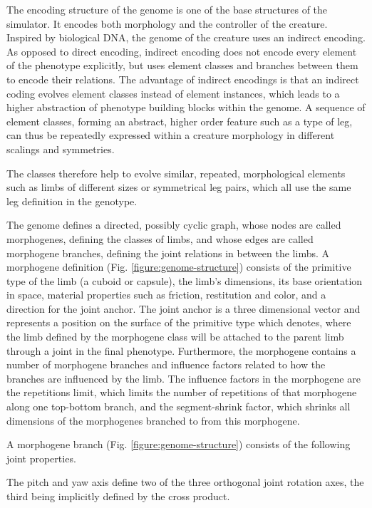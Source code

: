 \documentclass[main]{subfiles}
\begin{document}
The encoding structure of the genome is one of the base structures of the simulator. %
%
It encodes both morphology and the controller of the creature. %
%
Inspired by biological DNA, the genome of the creature uses an indirect encoding. %
%
As opposed to direct encoding, indirect encoding does not encode every element of the phenotype explicitly, but uses element classes and branches between them to encode their relations. %
%
The advantage of indirect encodings is that an indirect coding evolves element classes instead of element instances, which leads to a higher abstraction of phenotype building blocks within the genome. %
%
A sequence of element classes, forming an abstract, higher order feature such as a type of leg, can thus be repeatedly expressed within a creature morphology in different scalings and symmetries. %

The classes therefore help to evolve similar, repeated, morphological elements such as limbs of different sizes or symmetrical leg pairs, which all use the same leg definition in the genotype. %

The genome defines a directed, possibly cyclic graph, whose nodes are called morphogenes, defining the classes of limbs, and whose edges are called morphogene branches, defining the joint relations in between the limbs. %
%
A morphogene definition (Fig. \ref{figure:genome-structure}) consists of the primitive type of the limb (a cuboid or capsule), the limb's dimensions, its base orientation in space, material properties such as friction, restitution and color, and a direction for the joint anchor. %
%
The joint anchor is a three dimensional vector and represents a position on the surface of the primitive type which denotes, where the limb defined by the morphogene class will be attached to the parent limb through a joint in the final phenotype. %
%
Furthermore, the morphogene contains a number of morphogene branches and influence factors related to how the branches are influenced by the limb. %
%
The influence factors in the morphogene are the repetitions limit, which limits the number of repetitions of that morphogene along one top-bottom branch, and the segment-shrink factor, which shrinks all dimensions of the morphogenes branched to from this morphogene.

A morphogene branch (Fig. \ref{figure:genome-structure}) consists of the following joint properties. %

The pitch and yaw axis define two of the three orthogonal joint rotation axes, the third being implicitly defined by the cross product. %
\end{document}
